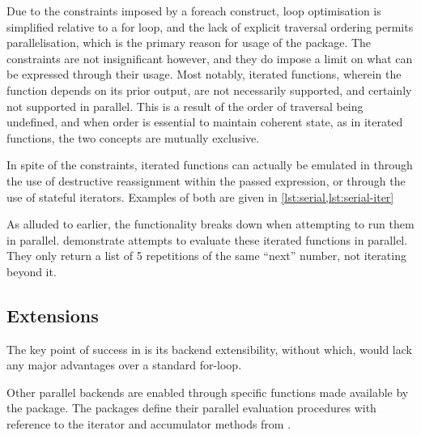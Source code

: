 Due to the constraints imposed by a foreach construct, loop optimisation is simplified relative to a for loop, and the lack of explicit traversal ordering permits parallelisation, which is the primary reason for usage of the  package.
The constraints are not insignificant however, and they do impose a limit on what can be expressed through their usage.
Most notably, iterated functions, wherein the function depends on its prior output, are not necessarily supported, and certainly not supported in parallel.
This is a result of the order of traversal being undefined, and when order is essential to maintain coherent state, as in iterated functions, the two concepts are mutually exclusive.

In spite of the constraints, iterated functions can actually be emulated in  through the use of destructive reassignment within the passed expression, or through the use of stateful iterators.
Examples of both are given in \cref{lst:serial,lst:serial-iter}



As alluded to earlier, the functionality breaks down when attempting to run them in parallel.
 demonstrate attempts to evaluate these iterated functions in parallel.
They only return a list of 5 repetitions of the same ``next'' number, not iterating beyond it.



\subsection{Extensions}\label{subsec:foreach-extensions}

The key point of success in  is its backend extensibility, without which,  would lack any major advantages over a standard for-loop.

Other parallel backends are enabled through specific functions made available by the  package.
The packages define their parallel evaluation procedures with reference to the iterator and accumulator methods from .

